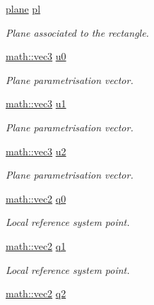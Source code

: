 \begin{DoxyCompactItemize}
\mbox{\label{classphysim_1_1geometric_1_1rectangle_af9c8331b7c76cf77289e08af9b97531e}} 
\hyperlink{classphysim_1_1geometric_1_1plane}{plane} \hyperlink{classphysim_1_1geometric_1_1rectangle_af9c8331b7c76cf77289e08af9b97531e}{pl}
\begin{DoxyCompactList}\small\item\em Plane associated to the rectangle. \end{DoxyCompactList}\item 
\hyperlink{structphysim_1_1math_1_1vec3}{math\+::vec3} \hyperlink{classphysim_1_1geometric_1_1rectangle_a09333b95cf8b78186b465a59771f4037}{u0}
\begin{DoxyCompactList}\small\item\em Plane parametrisation vector. \end{DoxyCompactList}\item 
\hyperlink{structphysim_1_1math_1_1vec3}{math\+::vec3} \hyperlink{classphysim_1_1geometric_1_1rectangle_a0570b2c50e93ca033123eaaa00a0e068}{u1}
\begin{DoxyCompactList}\small\item\em Plane parametrisation vector. \end{DoxyCompactList}\item 
\hyperlink{structphysim_1_1math_1_1vec3}{math\+::vec3} \hyperlink{classphysim_1_1geometric_1_1rectangle_a237f0ac5cb92cd71726c5902fb802dc4}{u2}
\begin{DoxyCompactList}\small\item\em Plane parametrisation vector. \end{DoxyCompactList}\item 
\hyperlink{structphysim_1_1math_1_1vec2}{math\+::vec2} \hyperlink{classphysim_1_1geometric_1_1rectangle_a6597a22ccd74d61b3dd0a15585bc1f97}{q0}
\begin{DoxyCompactList}\small\item\em Local reference system point. \end{DoxyCompactList}\item 
\hyperlink{structphysim_1_1math_1_1vec2}{math\+::vec2} \hyperlink{classphysim_1_1geometric_1_1rectangle_adfe3ecd2eeb09b873ea2f619ae799719}{q1}
\begin{DoxyCompactList}\small\item\em Local reference system point. \end{DoxyCompactList}\item 
\hyperlink{structphysim_1_1math_1_1vec2}{math\+::vec2} \hyperlink{classphysim_1_1geometric_1_1rectangle_a43fba2f1112ada230301638e4ec3e3a2}{q2}

\end{DoxyCompactItemize}
